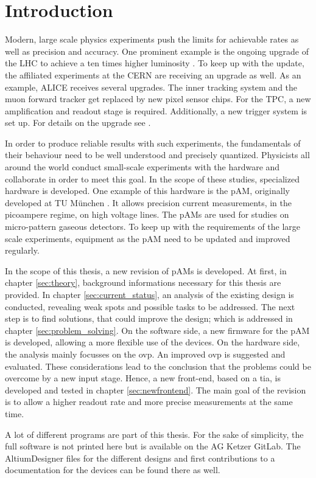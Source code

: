 \chapter{Introduction}
\label{sec:intro}
Modern, large scale physics experiments push the limits for achievable rates as well as precision and accuracy. One prominent example is the ongoing upgrade of the \ac{LHC} to achieve a ten times higher luminosity \cite{LHC}. To keep up with the update, the affiliated experiments at the \ac{CERN} are receiving an upgrade as well. As an example, \ac{ALICE} receives several upgrades. The inner tracking system and the muon forward tracker get replaced by new pixel sensor chips. For the \ac{TPC}, a new amplification and readout stage is required. Additionally, a new trigger system is set up. For details on the upgrade see \cite{alice}.

In order to produce reliable results with such experiments, the fundamentals of their behaviour need to be well understood and precisely quantized. Physicists all around the world conduct small-scale experiments with the hardware and collaborate in order to meet this goal. 
In the scope of these studies, specialized hardware is developed. One example of this hardware is the \ac{pAM}, originally developed at TU München \cite{bugl,roedel,rudolph}. It allows precision current measurements, in the picoampere regime, on high voltage lines. The \acp{pAM} are used for studies on micro-pattern gaseous detectors.
To keep up with the requirements of the large scale experiments, equipment as the \ac{pAM} need to be updated and improved regularly. 

In the scope of this thesis, a new revision of \acp{pAM} is developed. 
At first, in chapter \ref{sec:theory}, background informations necessary for this thesis are provided. In chapter \ref{sec:current_status}, an analysis of the existing design is conducted, revealing weak spots and possible tasks to be addressed. The next step is to find solutions, that could improve the design; which is addressed in chapter \ref{sec:problem_solving}. On the software side, a new firmware for the \ac{pAM} is developed, allowing a more flexible use of the devices. 
On the hardware side, the analysis mainly focusses on the \ac{ovp}. An improved \ac{ovp} is suggested and evaluated. These considerations lead to the conclusion that the problems could be overcome by a new input stage. Hence, a new front-end, based on a \ac{tia}, is developed and tested in chapter \ref{sec:newfrontend}. The main goal of the revision is to allow a higher readout rate and more precise measurements at the same time. 

A lot of different programs are part of this thesis. For the sake of simplicity, the full software is not printed here but is available on the AG Ketzer GitLab. The AltiumDesigner files for the different designs and first contributions to a documentation for the devices can be found there as well.
